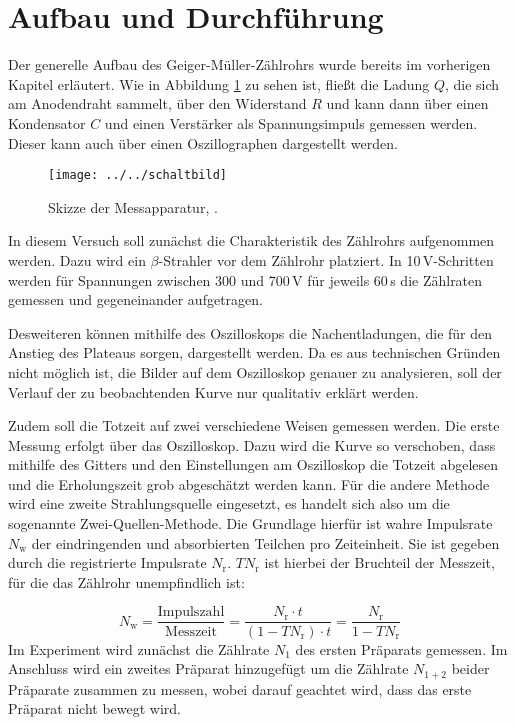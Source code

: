 \section{Aufbau und Durchführung}

Der generelle Aufbau des Geiger-Müller-Zählrohrs wurde bereits im vorherigen Kapitel erläutert. Wie in Abbildung \ref{fig:schaltbild} zu sehen ist, fließt die Ladung $Q$, die sich am Anodendraht sammelt, über den Widerstand $R$ und kann dann über einen 
Kondensator $C$ und einen Verstärker als Spannungsimpuls gemessen werden. Dieser kann auch über einen Oszillographen dargestellt werden.

\begin{figure}[h!tbp]
	\centering
	\texttt{[image: ../../schaltbild]}
	\caption{Skizze der Messapparatur, \cite[7]{anleitung703}.}
	\label{fig:schaltbild}
\end{figure}

In diesem Versuch soll zunächst die Charakteristik des Zählrohrs aufgenommen werden. Dazu wird ein $\beta$-Strahler vor dem Zählrohr platziert. In 10\,V-Schritten werden für Spannungen zwischen 300 und 700\,V für jeweils 60\,s die Zählraten gemessen 
und gegeneinander aufgetragen.

Desweiteren können mithilfe des Oszilloskops die Nachentladungen, die für den Anstieg des Plateaus sorgen, dargestellt werden. Da es aus technischen Gründen nicht möglich ist, die Bilder auf dem Oszilloskop genauer zu analysieren, soll der Verlauf der
zu beobachtenden Kurve nur qualitativ erklärt werden.

Zudem soll die Totzeit auf zwei verschiedene Weisen gemessen werden. Die erste Messung erfolgt über das Oszilloskop. Dazu wird die Kurve so verschoben, dass mithilfe des Gitters und den Einstellungen am Oszilloskop die Totzeit abgelesen und die 
Erholungszeit grob abgeschätzt werden kann. Für die andere Methode wird eine zweite Strahlungsquelle eingesetzt, es handelt sich also um die sogenannte Zwei-Quellen-Methode. Die Grundlage hierfür ist wahre Impulsrate $N_{\text{w}}$ der eindringenden und absorbierten
Teilchen pro Zeiteinheit. Sie ist gegeben durch die registrierte Impulsrate $N_{\text{r}}$. $TN_{\text{r}}$ ist hierbei der Bruchteil der Messzeit, für die das Zählrohr unempfindlich ist:

\begin{equation*}
N_{\text{w}} = \frac{\text{Impulszahl}}{\text{Messzeit}} = \frac{N_{\text{r}} \cdot t}{(1-TN_{\text{r}})\cdot t} = \frac{N_{\text{r}}}{1-TN_{\text{r}}}
\label{eqn:impulsrate}
\end{equation*}
Im Experiment wird zunächst die Zählrate $N_1$ des ersten Präparats gemessen. Im Anschluss wird ein zweites Präparat hinzugefügt um die Zählrate $N_{1+2}$ beider Präparate zusammen zu messen, wobei darauf geachtet wird, dass das erste Präparat nicht bewegt wird.

